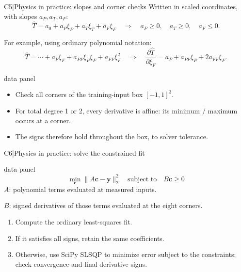 \renewcommand{\backupcode}{C5}
\begin{frame}[more-space,label=backup-C5]{C5\enspace|\enspace Physics in practice: slopes and corner checks}
  \small
  Written in scaled coordinates, with slopes $a_P,a_T,a_F$:
  \[
    \widehat T=a_0+a_P\xi_P+a_T\xi_T+a_F\xi_F
    \quad\Longrightarrow\quad
    a_P\geq0,\quad a_T\geq0,\quad a_F\leq0.
  \]
  \par\smallskip
  For example, using ordinary polynomial notation:
  \[
    \widehat T=\cdots+a_F\xi_F+a_{PF}\xi_P\xi_F+a_{FF}\xi_F^2
    \quad\Longrightarrow\quad
    \frac{\partial\widehat T}{\partial\xi_F}
      =a_F+a_{PF}\xi_P+2a_{FF}\xi_F.
  \]
  \par\vfill
  \begin{beamercolorbox}[sep=2.5mm,wd=\textwidth]{data panel}
    \begin{itemize}
      \item Check all corners of the training-input box $[-1,1]^3$.
      \item For total degree 1 or 2, every derivative is affine:
        its minimum / maximum occurs at a corner.
      \item The signs therefore hold throughout the box, to solver tolerance.
    \end{itemize}
  \end{beamercolorbox}
\end{frame}

\renewcommand{\backupcode}{C6}
\begin{frame}[more-space,label=backup-C6]{C6\enspace|\enspace Physics in practice: solve the constrained fit}
  \small
  \begin{beamercolorbox}[sep=2mm,wd=\textwidth]{data panel}
    \[
      \boxed{\min_{\mathbf c}\|A\mathbf c-\mathbf y\|_2^2
        \quad\text{subject to}\quad B\mathbf c\geq0}
    \]
    $A$: polynomial terms evaluated at measured inputs.
    \par\smallskip
    $B$: signed derivatives of those terms evaluated at the eight corners.
  \end{beamercolorbox}
  \par\vfill
  \begin{enumerate}
    \item Compute the ordinary least-squares fit.
    \item If it satisfies all signs, retain the same coefficients.
    \item Otherwise, use SciPy SLSQP to minimize error subject to the constraints;
      check convergence and final derivative signs.
  \end{enumerate}
  \par\vfill
\end{frame}
